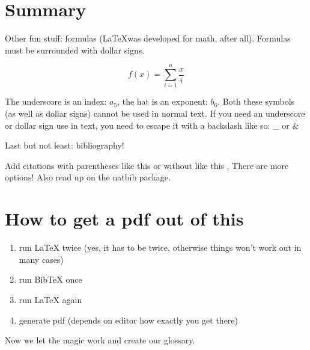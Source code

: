 \documentclass[12pt]{article}
\begin{document}
\section{Summary}

Other fun stuff: formulas (\LaTeX was developed for math, after all). Formulas must be surrounded with dollar signs.

$$
	f(x) = \sum_{i=1}^{n} \frac{x}{i}
$$

The underscore is an index: $a_5$, the hat is an exponent: $b_6$. Both these symbols (as well as dollar signs) cannot be used in normal text.
If you need an underscore or dollar sign use in text, you need to escape it with a backslash like so: \_ or \&


Last but not least: bibliography!

Add citations with parentheses like this  \citep{bickel2007typology} or without like this  \citealt{macaulay1996grammar}.
There are more options! Also read up on the natbib package.



\section{How to get a pdf out of this} %
\label{sec:pdf}



\begin{enumerate}
	\item run \LaTeX{} twice (yes, it has to be twice, otherwise things won't work out in many cases)
	\item run BibTeX once
	\item run \LaTeX{} again
	\item generate pdf (depends on editor how exactly you get there)
\end{enumerate}




Now we let the magic work and create our glossary. 

\printglossary[title=Glosses,type=\leipzigtype, style=block]


	

	
\end{document}
